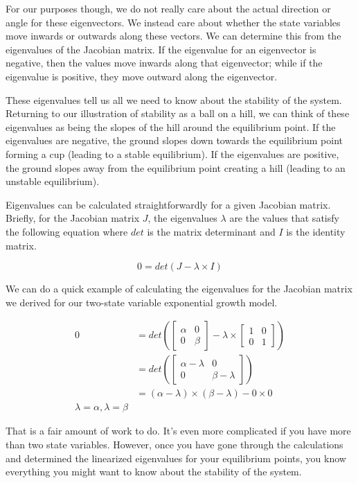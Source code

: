 \documentclass[]{memoir}
\begin{document}
For our purposes though, we do not really care about the actual
direction or angle for these eigenvectors. We instead care about whether
the state variables move inwards or outwards along these vectors. We can
determine this from the eigenvalues of the Jacobian matrix. If the
eigenvalue for an eigenvector is negative, then the values move inwards
along that eigenvector; while if the eigenvalue is positive, they move
outward along the eigenvector.

These eigenvalues tell us all we need to know about the stability of the
system. Returning to our illustration of stability as a ball on a hill,
we can think of these eigenvalues as being the slopes of the hill around
the equilibrium point. If the eigenvalues are negative, the ground
slopes down towards the equilibrium point forming a cup (leading to a
stable equilibrium). If the eigenvalues are positive, the ground slopes
away from the equilibrium point creating a hill (leading to an unstable
equilibrium).

Eigenvalues can be calculated straightforwardly for a given Jacobian
matrix. Briefly, for the Jacobian matrix $J$, the eigenvalues $\lambda$
are the values that satisfy the following equation where $det$ is the
matrix determinant and $I$ is the identity matrix.

\[
0=det(J-\lambda \times I)
\]

We can do a quick example of calculating the eigenvalues for the
Jacobian matrix we derived for our two-state variable exponential growth
model.

\[
\begin{aligned}
0 &= det\left(\begin{bmatrix} \alpha  & 0 \\ 0 & \beta \end{bmatrix} - \lambda  \times  \begin{bmatrix} 1 & 0 \\ 0 & 1 \end{bmatrix} \right) \\
 &= det\left(\begin{bmatrix} \alpha -\lambda & 0 \\ 0 & \beta-\lambda \end{bmatrix}\right) \\
 &= (\alpha-\lambda) \times (\beta-\lambda) - 0 \times 0 \\
\lambda = \alpha, \lambda = \beta
\end{aligned}
\]

That is a fair amount of work to do. It's even more complicated if you
have more than two state variables. However, once you have gone through
the calculations and determined the linearized eigenvalues for your
equilibrium points, you know everything you might want to know about the
stability of the system.
\end{document}
